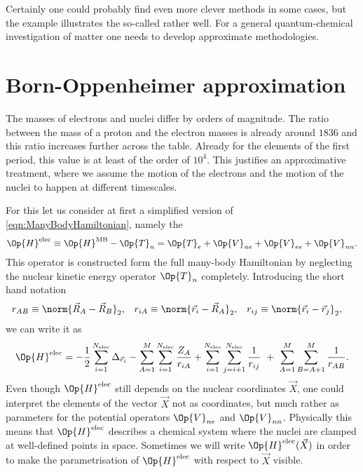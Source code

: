 Certainly one could probably find even more clever methods in some cases,
but the example illustrates the so-called  rather well.
For a general quantum-chemical investigation of matter
one needs to develop approximate methodologies.

\section{Born-Oppenheimer approximation}
\label{sec:BO}
The masses of electrons and nuclei differ by orders of magnitude.
The ratio between the mass of a proton and the electron masses
is already around $1836$ and this ratio increases
further across the table.
Already for the elements of the first period,
this value is at least of the order of $10^4$.
This justifies an approximative treatment,
where we assume the motion of the electrons
and the motion of the nuclei to happen at different timescales.

For this let us consider at first
a simplified version of \eqref{eqn:ManyBodyHamiltonian},
namely the 
\[
	\Op{H}^\text{elec} \equiv \Op{H}^\text{MB} - \Op{T}_n
	= \Op{T}_e + \Op{V}_{ne} + \Op{V}_{ee} + \Op{V}_{nn}.
\]
This operator is constructed form the full many-body Hamiltonian
by neglecting the nuclear kinetic energy operator $\Op{T}_n$ completely.
Introducing the short hand notation
\begin{align*}
r_{AB} &\equiv \norm{\vec{R}_A - \vec{R}_B}_2, &
r_{iA} &\equiv \norm{\vec{r}_i - \vec{R}_A}_2, &
r_{ij} &\equiv \norm{\vec{r}_i - \vec{r}_j}_2, &
\end{align*}
we can write it as
\begin{equation}
	\Op{H}^\text{elec}
	= - \frac12 \sum_{i=1}^{\Nelec} \Delta_{\vec{r}_i}
	- \sum_{A=1}^M \sum_{i=1}^{\Nelec} \frac{Z_A}{r_{iA}}
	+ \sum_{i=1}^{\Nelec} \sum_{j=i+1}^{\Nelec} \frac{1}{r_{ij}}
	\  + \  %
	\sum_{A=1}^{M} \sum_{B=A+1}^{M} \frac{1}{r_{AB}}.
	\label{eqn:ElectronicFullHamiltonian}
\end{equation}
Even though $\Op{H}^\text{elec}$ still depends on the nuclear coordinates $\vec{X}$,
one could interpret the elements of the vector
$\vec{X}$ not as coordinates,
but much rather as parameters for the potential operators $\Op{V}_{ne}$ and $\Op{V}_{nn}$.
Physically this means that $\Op{H}^\text{elec}$ describes a chemical system
where the nuclei are clamped at well-defined points in space.
Sometimes we will write $\Op{H}^\text{elec}(\vec{X})$
in order to make the parametrisation of $\Op{H}^\text{elec}$ with respect to $\vec{X}$
visible.

